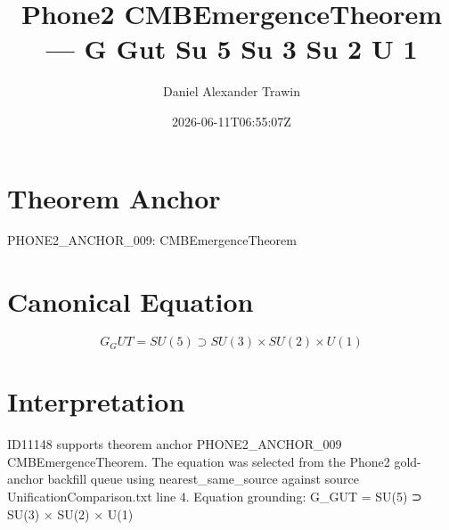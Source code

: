\documentclass[11pt]{article}
\title{Phone2 CMBEmergenceTheorem — G Gut Su 5 Su 3 Su 2 U 1}
\author{Daniel Alexander Trawin}
\date{2026-06-11T06:55:07Z}
\begin{document}
\maketitle
\section*{Theorem Anchor}
PHONE2_ANCHOR_009: CMBEmergenceTheorem
\section*{Canonical Equation}
\[
G_GUT = SU(5) ⊃ SU(3) × SU(2) × U(1)
\]
\section*{Interpretation}
ID11148 supports theorem anchor PHONE2_ANCHOR_009 CMBEmergenceTheorem. The equation was selected from the Phone2 gold-anchor backfill queue using nearest_same_source against source UnificationComparison.txt line 4. Equation grounding: G_GUT = SU(5) ⊃ SU(3) × SU(2) × U(1)
\end{document}
